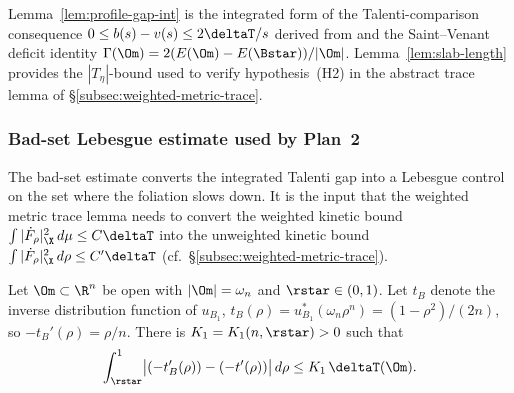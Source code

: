 \begin{remark}
Lemma~\ref{lem:profile-gap-int} is the integrated form of the
Talenti-comparison consequence
$0\le b(s)-v(s)\le 2\deltaT/s$ derived from
\cite[Thm.~1]{Talenti1976} and the Saint--Venant deficit identity
$\Gamma(\Om)=2(E(\Om)-E(\Bstar))/|\Om|$. Lemma~\ref{lem:slab-length}
provides the $|T_\eta|$-bound used to verify hypothesis~(H2) in the
abstract trace lemma of \S\ref{subsec:weighted-metric-trace}.
\end{remark}

\subsubsection{Bad-set Lebesgue estimate used by Plan~2}\label{ssec:badset}

The bad-set estimate converts the integrated Talenti gap into a
Lebesgue control on the set where the foliation slows down. It is
the input that the weighted metric trace lemma needs to convert the
weighted kinetic bound
$\int|\dot F_\rho|_\X^2\,d\mu\le C\deltaT$ into the unweighted kinetic
bound $\int|\dot F_\rho|_\X^2\,d\rho\le C'\deltaT$
(cf.\ \S\ref{subsec:weighted-metric-trace}).

\begin{lemma}\label{lem:talenti-gap}
Let $\Om\subset\R^n$ be open with $|\Om|=\omega_n$ and
$\rstar\in(0,1)$. Let $t_B$ denote the inverse distribution
function of $u_{B_1}$,
$t_B(\rho)=u^*_{B_1}(\omega_n\rho^n)=(1-\rho^2)/(2n)$, so
$-t_B'(\rho)=\rho/n$. There is $K_1=K_1(n,\rstar)>0$ such that
\begin{equation}\label{eq:talenti-gap-int}
   \int_{\rstar}^{1}\bigl|(-t_B'(\rho))-(-t'(\rho))\bigr|\,d\rho
   \le K_1\,\deltaT(\Om).
\end{equation}
\end{lemma}

